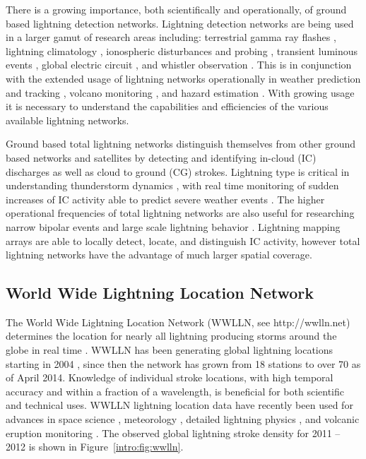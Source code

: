 There is a growing importance, both scientifically and operationally, of ground based lightning detection networks.
Lightning detection networks are being used in a larger gamut of research areas including: terrestrial gamma ray flashes \citep{Dwyer2012, Gjesteland2011, Connaughton2010}, lightning climatology \citep{Virts2013, Virts2011a, Burgesser2012}, ionospheric disturbances and probing \citep{Jacobson2010, Singh2011}, transient luminous events \citep{Soula2011}, global electric circuit  \citep{Holzworth2005}, and whistler observation \citep{Collier2010, Collier2011a, Burkholder2013}.
This is in conjunction with the extended usage of lightning networks operationally in weather prediction and tracking \citep{Fierro2012, Pan2010, Thomas2010d}, volcano monitoring \citep{Doughton2010}, and hazard estimation \citep{Altaratz2010}.
With growing usage it is necessary to understand the capabilities and efficiencies of the various available lightning networks.

Ground based total lightning networks distinguish themselves from other ground based networks and satellites by detecting and identifying in-cloud (IC) discharges as well as cloud to ground (CG) strokes.
Lightning type is critical in understanding thunderstorm dynamics \citep{Williams1989}, with real time monitoring of sudden increases of IC activity able to predict severe weather events \citep{Rudlosky2013, Darden2010, Metzger2013, Schultz2009, Schultz2011}.
The higher operational frequencies of total lightning networks are also useful for researching narrow bipolar events \citep{Suszcynsky2003} and large scale lightning behavior \citep{Hutchins2013}.
Lightning mapping arrays are able to locally detect, locate, and distinguish IC activity, however total lightning networks have the advantage of much larger spatial coverage.

\subsection{World Wide Lightning Location Network}

The World Wide Lightning Location Network (WWLLN, see http://wwlln.net) determines the location for nearly all lightning producing storms around the globe in real time \citep{Jacobson2006c}.
WWLLN has been generating global lightning locations starting in 2004 \citep{Rodger2006, Rodger2009}, since then the network has grown from 18 stations to over 70 as of April 2014.
Knowledge of individual stroke locations, with high temporal accuracy and within a fraction of a wavelength, is beneficial for both scientific and technical uses.
WWLLN lightning location data have recently been used for advances in space science \citep{Lay2007, Kumar2009, Collier2009, Holzworth2011, Jacobson2011}, meteorology \citep{Price2009,Thomas2010d}, detailed lightning physics \citep{Connaughton2010}, and volcanic eruption monitoring \citep{Doughton2010}.
The observed global lightning stroke density for 2011 -- 2012 is shown in Figure~\ref{intro:fig:wwlln}.

